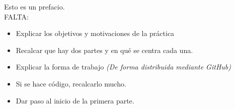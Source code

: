 \lettrine[lines=1,slope=4pt,findent=0pt]{E}{}sto es un prefacio.\\

\color{red}
FALTA:
\begin{itemize}
\item Explicar los objetivos y motivaciones de la práctica
\item Recalcar que hay dos partes y en qué se centra cada una.
\item Explicar la forma de trabajo \textit{(De forma distribuida mediante GitHub)}
\item Si se hace código, recalcarlo mucho.
\item Dar paso al inicio de la primera parte.
\end{itemize}
\color{black}